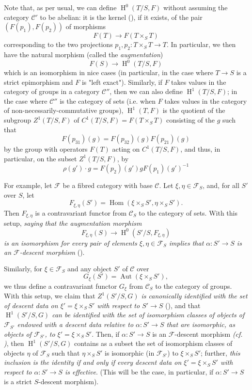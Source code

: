 Note that, as per usual, we can define $\operatorname{H}^0(T/S,F)$ without assuming the category $\mathcal{C}'$ to be abelian:
it is the kernel (), if it exists, of the pair $(F(p_1),F(p_2))$ of morphisms
\[
    F(T) \to F(T\times_S T)
\]
corresponding to the two projections $p_1,p_2\colon T\times_S T\to T$.
In particular, we then have the natural morphism (called the \emph{augmentation})
\[
    F(S) \to \operatorname{H}^0(T/S,F)
\]
which is an isomorphism in nice cases (in particular, in the case where $T\to S$ is a strict epimorphism and $F$ is "left exact").
Similarly, if $F$ takes values in the category of groups in a category $\mathcal{C}''$, then we can also define $\operatorname{H}^1(T/S,F)$;
in the case where $\mathcal{C}''$ is the category of sets (i.e. when $F$ takes values in the category of non-necessarily-commutative groups), $\operatorname{H}^1(T,F)$ is the quotient of the subgroup $Z^1(T/S,F)$ of $C^1(T/S,F) = F(T\times_S T)$ consisting of the $g$ such that
\[
    F(p_{31})(g) = F(p_{32})(g) F(p_{21})(g)
\]
by the group with operators $F(T)$ acting on $C^1(T/S,F)$, and thus, in particular, on the subset $Z^1(T/S,F)$, by
\[
    \rho(g')\cdot g = F(p_2)(g') g F(p_1)(g')^{-1}
\]

\label{fga3.i-a.4.b}
For example, let $\mathcal{F}$ be a fibred category with base $\mathcal{C}$.
Let $\xi,\eta\in\mathcal{F}_S$, and, for all $S'$ over $S$, let
\[
    F_{\xi,\eta}(S')
    = \operatorname{Hom}(\xi\times_S S', \eta\times_S S').
\]
Then $F_{\xi,\eta}$ is a contravariant functor from $\mathcal{C}_S$ to the category of sets.
With this setup, \emph{saying that the augmentation morphism}
\[
    F_{\xi,\eta}(S) \to \operatorname{H}^0(S'/S,F_{\xi,\eta})
\]
\emph{is an isomorphism for every pair of elements $\xi,\eta\in\mathcal{F}_S$ implies that $\alpha\colon S'\to S$ is an $\mathcal{F}$-descent morphism} ().

\label{fga3.i-a.4.c}
Similarly, for $\xi\in\mathcal{F}_S$ and any object $S'$ of $\mathcal{C}$ over
\[
    G_\xi(S') = \operatorname{Aut}(\xi\times_S S'),
\]
we thus define a contravariant functor $G_\xi$ from $\mathcal{C}_S$ to the category of groups.
With this setup, we claim that \emph{$Z^1(S'/S,G)$ is canonically identified with the set of descent data on $\xi'=\xi\times_S S'$ with respect to $S'\to S$} (), and that \emph{$\operatorname{H}^1(S'/S,G)$ can be identified with the set of isomorphism classes of objects of $\mathcal{F}_{S'}$ endowed with a descent data relative to $\alpha\colon S'\to S$ that are isomorphic, as objects of $\mathcal{F}_{S'}$, to $\xi'=\xi\times_S S'$}.
Then, if $\alpha\colon S'\to S$ is an $\mathcal{F}$-descent morphism \emph{(cf. )}, then $\operatorname{H}^1(S'/S,G)$ contains as a subset the set of isomorphism classes of objects $\eta$ of $\mathcal{F}_S$ such that $\eta\times_S S'$ is isomorphic (in $\mathcal{F}_{S'}$) to $\xi\times_S S'$;
further, \emph{this inclusion is the identity if and only if every descent data on $\xi'=\xi\times_S S'$ with respect to $\alpha\colon S'\to S$ is effective}.
(This will be the case, in particular, if $\alpha\colon S'\to S$ is a strict $S$-descent morphism).

